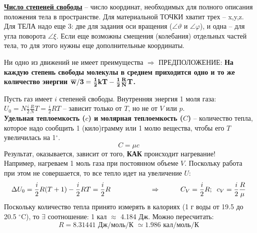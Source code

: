 \underline{\bf Число степеней свободы} -- число координат, необходимых для пол\-но\-го описания положения тела в пространстве. Для материальной ТОЧКИ хватит трех -- x,y,z. Для ТЕЛА надо еще 3: две для задания оси вращения ($\angle\vartheta$ и $\angle\varphi$), и одна -- для угла поворота $\angle\xi$. Если еще возможны смещения (колебания) отдельных частей тела, то для этого нужны еще дополнитель\-ные координаты.

Ни одно из движений не имеет преимущества $\Rightarrow$ ПРЕДПОЛОЖЕНИЕ:
{\bf На каждую степень свободы молекулы в среднем приходится одно и то же количество энергии $\bf \overline{w}/3=\frac12kT-\frac12\frac RNT$.}

Пусть газ имеет $i$ степеней свободы. Внутренняя энергия 1 моля газа:
$U_0=N\frac i2\frac RNT = \frac i2RT $ -- зависит только от $T$, но не от $V$ или $p$.\\

{\bf Удельная теплоемкость ($c$) и молярная теплоемкость ($C$)} -- количество тепла, которое надо сообщить 1 (кило)грамму или 1 молю вещества, чтобы его $T$ увеличилась на 1$^\circ$.
\begin{displaymath}
C=\mu c
\end{displaymath}
Результат, оказывается, зависит от того, {\bf КАК} происходит нагревание!\\

Например, нагреваем 1 моль газа при постоянном объеме $V$. Поскольку работа при этом не совершается, то все тепло идет на увеличение $U$:
\begin{displaymath}
\Delta U_0 =\frac i2R(T+1)-\frac i2RT = \frac i2R \hspace{20mm}\Rightarrow \hspace{10mm}
C_V=\frac i2R;\;\;c_V=\frac i2\frac R\mu
\end{displaymath}
Поскольку количество тепла принято измерять в калориях (1 г воды от 19.5 до 20.5 $^\circ$C), то $\exists$ соотношение: 1 кал $\approx$ 4.184 Дж. Можно пересчитать:
\begin{displaymath}
R=8.31441\texttt{ Дж/моль/К }\simeq1.986\texttt{ кал/моль/К}
\end{displaymath}

